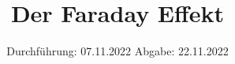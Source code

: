 

\subject{V 46}
\title{Der Faraday Effekt}
\date{%
  Durchführung: 07.11.2022
  \hspace{3em}
  Abgabe: 22.11.2022
}



\maketitle
\thispagestyle{empty}
\tableofcontents
\newpage








\printbibliography{}


